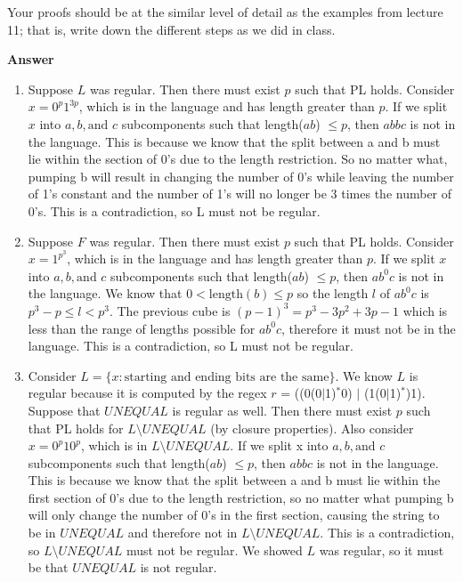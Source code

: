\documentclass[11pt]{article}
\newcommand \kw[1]{\textbf{#1}}
\newenvironment{answer}{
\vspace{.5cm}
\begin{mdframed}[]
    \kw{Answer} 
}
{
\end{mdframed}
\pagebreak
}
\begin{document}
\begin{enumerate}
 Your proofs should be at the similar level of detail as the examples from lecture 11; that is, write down the different steps as we did in class.

 \begin{answer}
    \begin{enumerate}
        \item Suppose $L$ was regular. Then there must exist $p$ such that PL holds. Consider $x = 0^p1^{3p}$, which is in the language and has length greater than $p$. If we split $x$ into $a, b, \text{and } c$ subcomponents such that length($ab$) $\le p$, then $abbc$ is not in the language. This is because we know that the split between a and b must lie within the section of 0's due to the length restriction. So no matter what, pumping b will result in changing the number of 0's while leaving the number of 1's constant and the number of 1's will no longer be 3 times the number of 0's. This is a contradiction, so L must not be regular.
        \item Suppose $F$ was regular. Then there must exist $p$ such that PL holds. Consider $x = 1^{p^3}$, which is in the language and has length greater than $p$. If we split $x$ into $a, b, \text{and } c$ subcomponents such that length($ab$) $\le p$, then $ab^0c$ is not in the language. We know that $0 < \text{length}(b) \le p$ so the length $l$ of $ab^0c$ is $p^3 - p \le l < p^3$. The previous cube is $(p - 1)^3 = p^3-3p^2+3p-1$ which is less than the range of lengths possible for $ab^0c$, therefore it must not be in the language. This is a contradiction, so L must not be regular. 
        \item Consider $L = \{x: \text{starting and ending bits are the same}\}$. We know $L$ is regular because it is computed by the regex $r$ = ((0(0$|$1)$^*$0) $|$ (1(0$|$1)$^*$)1). Suppose that $UNEQUAL$ is regular as well. Then there must exist $p$ such that PL holds for $L \setminus UNEQUAL$ (by closure properties). Also consider $x = 0^p10^p$, which is in $L \setminus UNEQUAL$. If we split x into $a, b, \text{and } c$ subcomponents such that length($ab$) $\le p$, then $abbc$ is not in the language. This is because we know that the split between a and b must lie within the first section of 0's due to the length restriction, so no matter what pumping b will only change the number of 0's in the first section, causing the string to be in $UNEQUAL$ and therefore not in $L \setminus UNEQUAL$. This is a contradiction, so $L \setminus UNEQUAL$ must not be regular. We showed $L$ was regular, so it must be that $UNEQUAL$ is not regular.
    \end{enumerate}
\end{answer}

\end{enumerate}
\end{document}
